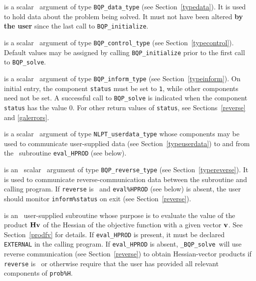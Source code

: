 \documentclass{galahad}
\newcommand{\packagename}{BQP}
\newcommand{\fullpackagename}{\libraryname\_\packagename}
\newcommand{\solver}{{\tt \fullpackagename\_solve}}
\begin{document}
\begin{description}
 is a scalar \intentinout\ argument of type 
{\tt \packagename\_data\_type}
(see Section~\ref{typedata}). It is used to hold data about the problem being 
solved. It must not have been altered {\bf by the user} since the last call to 
{\tt \packagename\_initialize}.

 is a scalar \intentin\ argument of type 
{\tt \packagename\_control\_type}
(see Section~\ref{typecontrol}). Default values may be assigned by calling 
{\tt \packagename\_initialize} prior to the first call to 
{\tt \packagename\_solve}.

 is a scalar \intentinout\ argument of type 
{\tt \packagename\_inform\_type}
(see Section~\ref{typeinform}). On initial entry, the component {\tt status}
must be set to {\tt 1}, while other components need not be set.
A successful call to
{\tt \packagename\_solve}
is indicated when the  component {\tt status} has the value 0. 
For other return values of {\tt status}, see Sections~\ref{reverse} and 
\ref{galerrors}.

 is a scalar \intentinout\ argument of type 
{\tt NLPT\_userdata\_type} whose components may be used
to communicate user-supplied data 
(see Section~\ref{typeuserdata})
to and from the \optional\ subroutine
 {\tt eval\_HPROD} (see below).

 is an \optional\ scalar \intentinout\ argument of type 
{\tt \packagename\_reverse\_type}
(see Section~\ref{typereverse}). 
It is used to communicate reverse-communication data between the 
subroutine and calling program.
If {\tt reverse} is \present\ and {\tt eval\%HPROD} (see below) is
absent, the user should monitor {\tt inform\%status} on exit
(see Section~\ref{reverse}).

 is an \optional\ 
user-supplied subroutine whose purpose is to evaluate the value of the 
product ${\mathbf{H}} {\mathbf{v}}$ of the Hessian of the objective function 
with a given vector ${\mathbf{v}}$.
See Section~\ref{prodfv} for details.
If {\tt eval\_HPROD} is present, 
it must be declared {\tt EXTERNAL} in the calling program.
If {\tt eval\_HPROD} is absent, \solver\ will use reverse communication 
(see Section~\ref{reverse}) 
to obtain Hessian-vector products if {\tt reverse} is \present\ or
otherwise require that the user has provided all relevant
components of {\tt prob\%H}.

\end{description}

\end{document}
